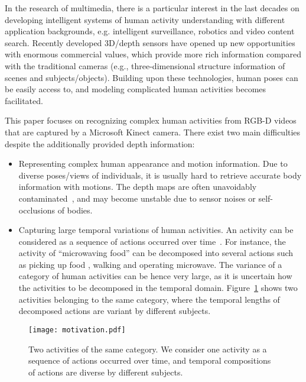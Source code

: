 \documentclass{sig-alternate}
\begin{document}
In the research of multimedia, there is a particular interest in the last decades on developing intelligent systems of human activity understanding with different application backgrounds, e.g. intelligent surveillance, robotics and video content search. Recently developed 3D/depth sensors have opened up new opportunities with enormous commercial values, which provide more rich information compared with the traditional cameras (e.g., three-dimensional structure information of scenes and subjects/objects). Building upon these technologies, human poses can be easily access to, and modeling complicated human activities becomes facilitated.

This paper focuses on recognizing complex human activities from RGB-D videos that are captured by a Microsoft Kinect camera. There exist two main difficulties despite the additionally provided depth information:

\begin{itemize}
    \item Representing complex human appearance and motion information. Due to diverse poses/views of individuals, it is usually hard to retrieve accurate body information with motions. The depth maps are often unavoidably contaminated~\cite{HON4D}, and may become unstable due to sensor noises or self-occlusions of bodies.

    \item Capturing large temporal variations of human activities. An activity can be considered as a sequence of actions occurred over time~\cite{CIVU2013survey}. For instance, the activity of ``microwaving food'' can be decomposed into several actions such as picking up food , walking and operating microwave. The variance of a category of human activities can be hence very large, as it is uncertain how the activities to be decomposed in the temporal domain. Figure~\ref{fig:motivation} shows two activities belonging to the same category, where the temporal lengths of decomposed actions are variant by different subjects.
\end{itemize}

\begin{figure}[!htb]
\centering
\texttt{[image: motivation.pdf]}
\caption{Two activities of the same category. We consider one activity as a sequence of actions occurred over time, and temporal compositions of actions are diverse by different subjects.}\label{fig:motivation}
\end{figure}
\end{document}
